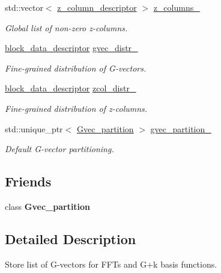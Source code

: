 \begin{DoxyCompactItemize}
\item 
std\+::vector$<$ \hyperlink{structsddk_1_1z__column__descriptor}{z\+\_\+column\+\_\+descriptor} $>$ \hyperlink{classsddk_1_1_gvec_afb61de598ed208a265d52656af86ab7d}{z\+\_\+columns\+\_\+}
\begin{DoxyCompactList}\small\item\em Global list of non-\/zero z-\/columns. \end{DoxyCompactList}\item 
\hyperlink{structsddk_1_1block__data__descriptor}{block\+\_\+data\+\_\+descriptor} \hyperlink{classsddk_1_1_gvec_a8f926d0894f62ca49404456d796c8d75}{gvec\+\_\+distr\+\_\+}
\begin{DoxyCompactList}\small\item\em Fine-\/grained distribution of G-\/vectors. \end{DoxyCompactList}\item 
\hyperlink{structsddk_1_1block__data__descriptor}{block\+\_\+data\+\_\+descriptor} \hyperlink{classsddk_1_1_gvec_a6f815b24a297f72ef7b974b046b2ec24}{zcol\+\_\+distr\+\_\+}
\begin{DoxyCompactList}\small\item\em Fine-\/grained distribution of z-\/columns. \end{DoxyCompactList}\item 
std\+::unique\+\_\+ptr$<$ \hyperlink{classsddk_1_1_gvec__partition}{Gvec\+\_\+partition} $>$ \hyperlink{classsddk_1_1_gvec_ae3f8dc02f9cc4f86bb3f92b145e31384}{gvec\+\_\+partition\+\_\+}
\begin{DoxyCompactList}\small\item\em Default G-\/vector partitioning. \end{DoxyCompactList}\end{DoxyCompactItemize}
\subsection*{Friends}
\begin{DoxyCompactItemize}
\item 
\hypertarget{classsddk_1_1_gvec_ab2d80f8720deb08791fc3db626e6d991}{}class {\bfseries Gvec\+\_\+partition}\label{classsddk_1_1_gvec_ab2d80f8720deb08791fc3db626e6d991}

\end{DoxyCompactItemize}


\subsection{Detailed Description}
Store list of G-\/vectors for F\+F\+Ts and G+k basis functions. 

